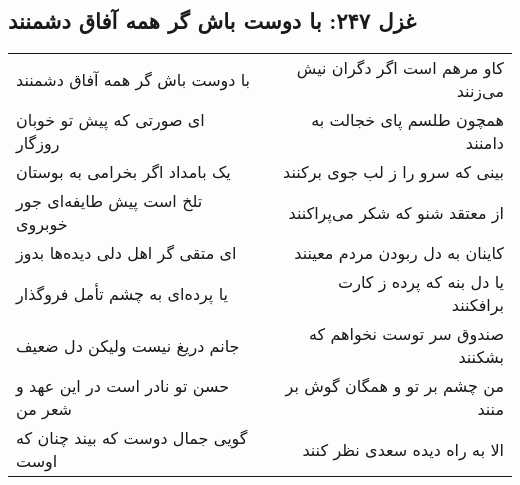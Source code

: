 \begin{center}
\section*{غزل ۲۴۷: با دوست باش گر همه آفاق دشمنند}
\label{sec:247}
\begin{longtable}{l p{0.5cm} r}
با دوست باش گر همه آفاق دشمنند
&&
کاو مرهم است اگر دگران نیش می‌زنند
\\
ای صورتی که پیش تو خوبان روزگار
&&
همچون طلسم پای خجالت به دامنند
\\
یک بامداد اگر بخرامی به بوستان
&&
بینی که سرو را ز لب جوی برکنند
\\
تلخ است پیش طایفه‌ای جور خوبروی
&&
از معتقد شنو که شکر می‌پراکنند
\\
ای متقی گر اهل دلی دیده‌ها بدوز
&&
کاینان به دل ربودن مردم معینند
\\
یا پرده‌ای به چشم تأمل فروگذار
&&
یا دل بنه که پرده ز کارت برافکنند
\\
جانم دریغ نیست ولیکن دل ضعیف
&&
صندوق سر توست نخواهم که بشکنند
\\
حسن تو نادر است در این عهد و شعر من
&&
من چشم بر تو و همگان گوش بر منند
\\
گویی جمال دوست که بیند چنان که اوست
&&
الا به راه دیده سعدی نظر کنند
\\
\end{longtable}
\end{center}
